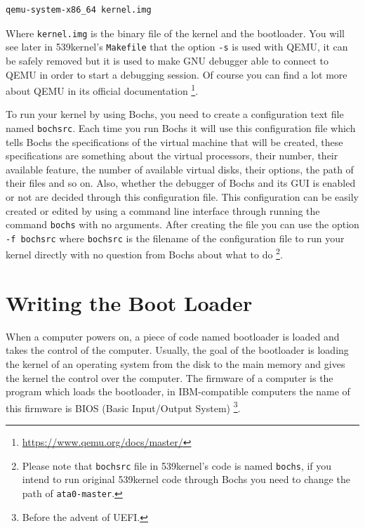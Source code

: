\begin{lstlisting}
qemu-system-x86_64 kernel.img
\end{lstlisting}

Where \lstinline!kernel.img! is the binary file of the kernel and the
bootloader. You will see later in 539kernel's \lstinline!Makefile! that
the option \lstinline!-s! is used with QEMU, it can be safely removed
but it is used to make GNU debugger able to connect to QEMU in order to
start a debugging session. Of course you can find a lot more about QEMU
in its official documentation \footnote{\url{https://www.qemu.org/docs/master/}}.

To run your kernel by using Bochs, you need to create a configuration
text file named \lstinline!bochsrc!. Each time you run Bochs it will use
this configuration file which tells Bochs the specifications of the
virtual machine that will be created, these specifications are something
about the virtual processors, their number, their available feature, the
number of available virtual disks, their options, the path of their
files and so on. Also, whether the debugger of Bochs and its GUI is
enabled or not are decided through this configuration file. This
configuration can be easily created or edited by using a command line
interface through running the command \lstinline!bochs! with no
arguments. After creating the file you can use the option
\lstinline!-f bochsrc! where \lstinline!bochsrc! is the filename of the
configuration file to run your kernel directly with no question from
Bochs about what to do \footnote{Please note that \lstinline!bochsrc!
  file in 539kernel's code is named \lstinline!bochs!, if you intend to
  run original 539kernel code through Bochs you need to change the path
  of \lstinline!ata0-master!.}.

\section{Writing the Boot Loader}\label{writing-the-boot-loader}

When a computer powers on, a piece of code named bootloader is loaded
and takes the control of the computer. Usually, the goal of the
bootloader is loading the kernel of an operating system from the disk to
the main memory and gives the kernel the control over the computer. The
firmware of a computer is the program which loads the bootloader, in
IBM-compatible computers the name of this firmware is BIOS (Basic
Input/Output System) \footnote{Before the advent of UEFI.}.


